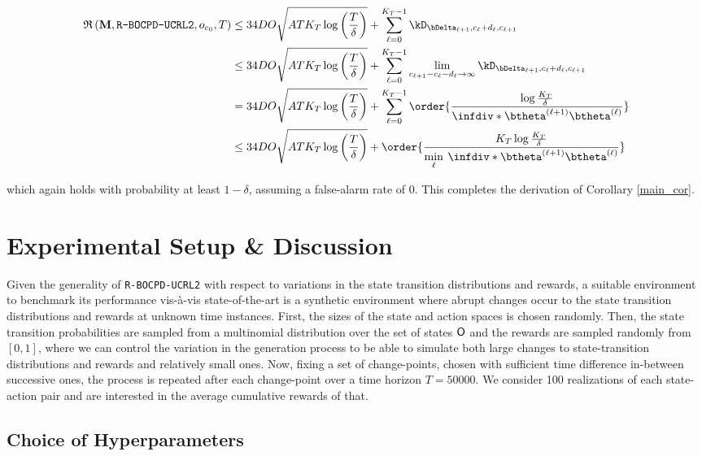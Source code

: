 \documentclass{article} %
\begin{document}
\begin{align*}
    \mathfrak{R} \left(\mathbf{M}, \texttt{R-BOCPD-UCRL2}, o_{c_0}, T\right) & \leq 34 D O \sqrt{A T K_T \log\left (\frac{T}{\delta} \right)} + \sum\limits_{\ell=0}^{K_T-1} \kD_{\bDelta_{\ell+1},c_{\ell}+d_{\ell},c_{\ell+1}} \\
    & \leq 34 D O \sqrt{A T K_T \log\left (\frac{T}{\delta} \right)} + \sum\limits_{\ell=0}^{K_T-1} \lim_{c_{\ell + 1} - c_\ell - d_\ell \to \infty} \kD_{\bDelta_{\ell+1},c_{\ell}+d_{\ell},c_{\ell+1}} \\
    & = 34 D O \sqrt{A T K_T \log\left (\frac{T}{\delta} \right)} + \sum\limits_{\ell=0}^{K_T-1} \order{\frac{\log \frac{K_T}{\delta}}{\infdiv*{\btheta^{(\ell+1)}}{\btheta^{(\ell)}}}} \\
    & \leq 34 D O \sqrt{A T K_T \log\left (\frac{T}{\delta} \right)} + \order{\frac{K_T \log \frac{K_T}{\delta}}{\min\limits_\ell \: \infdiv*{\btheta^{(\ell+1)}}{\btheta^{(\ell)}}}}
\end{align*}

which again holds with probability at least $1-\delta$, assuming a false-alarm rate of $0$. This completes the derivation of Corollary \ref{main_cor}. 

\section{Experimental Setup \& Discussion}\label{sec:xps}
Given the generality of \texttt{R-BOCPD-UCRL2} with respect to variations in the state transition distributions and rewards, a suitable environment to benchmark its performance vis-à-vis state-of-the-art is a synthetic environment where abrupt changes occur to the state transition distributions and rewards at unknown time instances. First, the sizes of the state and action spaces is chosen randomly. Then, the state transition probabilities are sampled from a multinomial distribution over the set of states ${\mathsf{O}}$ and the rewards are sampled randomly from $[0, 1]$, where we can control the variation in the generation process to be able to simulate both large changes to state-transition distributions and rewards and relatively small ones. Now, fixing a set of change-points, chosen with sufficient time difference in-between successive ones, the process is repeated after each change-point over a time horizon $T = 50000$. We consider 100 realizations of each state-action pair and are interested in the average cumulative rewards of that. 

\subsection{Choice of Hyperparameters}
\end{document}
